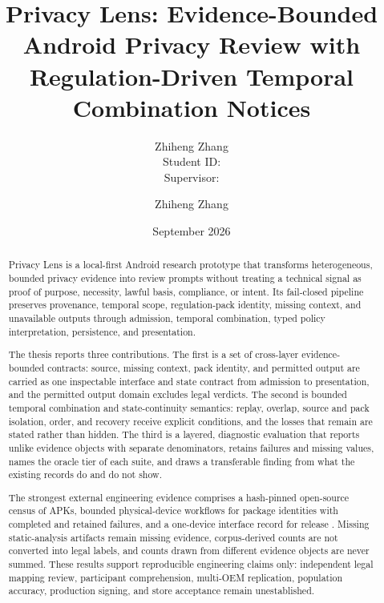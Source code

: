 \documentclass[11pt,a4paper]{report}
\title{Privacy Lens: Evidence-Bounded Android Privacy Review with Regulation-Driven Temporal Combination Notices}
\author{Zhiheng Zhang \\ Student ID: \PrivacyLensStudentID \\ Supervisor: \PrivacyLensSupervisor}
\author{Zhiheng Zhang}
\date{September 2026}
\begin{document}
\maketitle
\begin{abstract}
\small\singlespacing
Privacy Lens is a local-first Android research prototype that transforms heterogeneous, bounded privacy evidence into review prompts without treating a technical signal as proof of purpose, necessity, lawful basis, compliance, or intent. Its fail-closed pipeline preserves provenance, temporal scope, regulation-pack identity, missing context, and unavailable outputs through admission, temporal combination, typed policy interpretation, persistence, and presentation.

The thesis reports three contributions. The first is a set of cross-layer evidence-bounded contracts: source, missing context, pack identity, and permitted output are carried as one inspectable interface and state contract from admission to presentation, and the permitted output domain excludes legal verdicts. The second is bounded temporal combination and state-continuity semantics: replay, overlap, source and pack isolation, order, and recovery receive explicit conditions, and the losses that remain are stated rather than hidden. The third is a layered, diagnostic evaluation that reports unlike evidence objects with separate denominators, retains failures and missing values, names the oracle tier of each suite, and draws a transferable finding from what the existing records do and do not show.

The strongest external engineering evidence comprises a hash-pinned open-source census of \FDroidCensusN{} APKs, bounded physical-device workflows for \DevicePackagesN{} package identities with \CompletedWorkflowsN{} completed and \FailedDeviceWorkflowsN{} retained failures, and a one-device interface record for release \PrivacyLensVersion{}. Missing static-analysis artifacts remain missing evidence, corpus-derived counts are not converted into legal labels, and counts drawn from different evidence objects are never summed. These results support reproducible engineering claims only: independent legal mapping review, participant comprehension, multi-OEM replication, population accuracy, production signing, and store acceptance remain unestablished.
\end{abstract}
\newpage
\tableofcontents
\newpage







\end{document}
